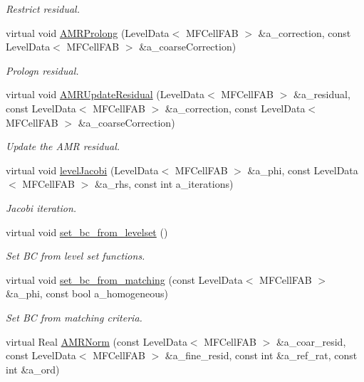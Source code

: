 \begin{DoxyCompactItemize}
\begin{DoxyCompactList}\small\item\em Restrict residual. \end{DoxyCompactList}\item 
virtual void \hyperlink{classmfconductivityop_a3f9ee45a375903ec76da62aac345fdf3}{A\+M\+R\+Prolong} (Level\+Data$<$ M\+F\+Cell\+F\+AB $>$ \&a\+\_\+correction, const Level\+Data$<$ M\+F\+Cell\+F\+AB $>$ \&a\+\_\+coarse\+Correction)
\begin{DoxyCompactList}\small\item\em Prologn residual. \end{DoxyCompactList}\item 
virtual void \hyperlink{classmfconductivityop_aeb15ed108d589b7aa6404e52f2a4f11e}{A\+M\+R\+Update\+Residual} (Level\+Data$<$ M\+F\+Cell\+F\+AB $>$ \&a\+\_\+residual, const Level\+Data$<$ M\+F\+Cell\+F\+AB $>$ \&a\+\_\+correction, const Level\+Data$<$ M\+F\+Cell\+F\+AB $>$ \&a\+\_\+coarse\+Correction)
\begin{DoxyCompactList}\small\item\em Update the A\+MR residual. \end{DoxyCompactList}\item 
virtual void \hyperlink{classmfconductivityop_a8cf41ed0bf15e006970ec52e126786be}{level\+Jacobi} (Level\+Data$<$ M\+F\+Cell\+F\+AB $>$ \&a\+\_\+phi, const Level\+Data$<$ M\+F\+Cell\+F\+AB $>$ \&a\+\_\+rhs, const int a\+\_\+iterations)
\begin{DoxyCompactList}\small\item\em Jacobi iteration. \end{DoxyCompactList}\item 
virtual void \hyperlink{classmfconductivityop_a34607687565c5e8fa2f4a972ae524f0a}{set\+\_\+bc\+\_\+from\+\_\+levelset} ()
\begin{DoxyCompactList}\small\item\em Set BC from level set functions. \end{DoxyCompactList}\item 
virtual void \hyperlink{classmfconductivityop_ae84941b67c5930982c23617f23394ed3}{set\+\_\+bc\+\_\+from\+\_\+matching} (const Level\+Data$<$ M\+F\+Cell\+F\+AB $>$ \&a\+\_\+phi, const bool a\+\_\+homogeneous)
\begin{DoxyCompactList}\small\item\em Set BC from matching criteria. \end{DoxyCompactList}\item 
virtual Real \hyperlink{classmfconductivityop_a97da0de7963dd46e99c1fb253d40245f}{A\+M\+R\+Norm} (const Level\+Data$<$ M\+F\+Cell\+F\+AB $>$ \&a\+\_\+coar\+\_\+resid, const Level\+Data$<$ M\+F\+Cell\+F\+AB $>$ \&a\+\_\+fine\+\_\+resid, const int \&a\+\_\+ref\+\_\+rat, const int \&a\+\_\+ord)

\end{DoxyCompactItemize}

